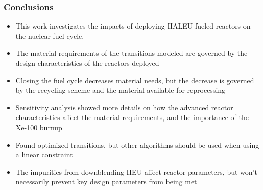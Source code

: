 \begin{frame}
      \frametitle{Conclusions}
      \begin{itemize}
        \item This work investigates the impacts of deploying \gls{HALEU}-fueled 
              reactors on the nuclear fuel cycle.
        \item<2-> The material requirements of the transitions modeled are governed 
              by the design characteristics of the reactors deployed
        \item<2-> Closing the fuel cycle decreases material needs, but the 
              decrease is governed by the recycling scheme and the 
              material available for reprocessing
        \item<3-> Sensitivity analysis showed more details on how the 
              advanced reactor characteristics affect the material requirements, and 
              the importance of the Xe-100 burnup
        \item<3-> Found optimized transitions, but other algorithms should 
              be used when using a linear constraint
        \item<4-> The impurities from downblending \gls{HEU} affect 
              reactor parameters, but won't necessarily prevent key design 
              parameters from being met
      \end{itemize}
\end{frame}

